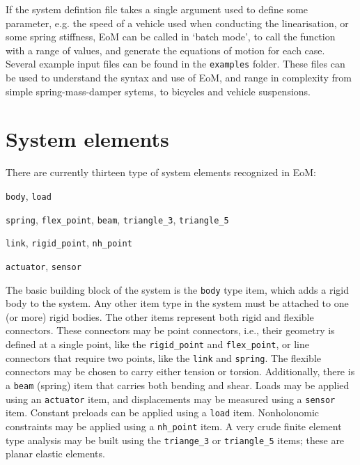 If the system defintion file takes a single argument used to define some parameter, e.g. the speed of a vehicle used when conducting the linearisation, or some spring stiffness, EoM can be called in `batch mode', to call the function with a range of values, and generate the equations of motion for each case.  Several example input files can be found in the \texttt{examples} folder.  These files can be used to understand the syntax and use of EoM, and range in complexity from simple spring-mass-damper sytems, to bicycles and vehicle suspensions.

\section{System elements}

There are currently thirteen type of system elements recognized in EoM:
\begin{description}\setlength\itemsep{0pt plus 0.3ex}
\item[fundamental:] \texttt{body}, \texttt{load}
\item[flexible connectors:] \texttt{spring}, \texttt{flex\_point}, \texttt{beam}, \texttt{triangle\_3}, \texttt{triangle\_5}
\item[rigid connectors:]\texttt{link}, \texttt{rigid\_point}, \texttt{nh\_point}
\item[input/output:] \texttt{actuator}, \texttt{sensor}
\end{description}

The basic building block of the system is the \texttt{body} type item, which adds a rigid body to the system.  Any other item type in the system must be attached to one (or more) rigid bodies.  The other items represent both rigid and flexible connectors.  These connectors may be point connectors, i.e., their geometry is defined at a single point, like the \texttt{rigid\_point} and \texttt{flex\_point}, or line connectors that require two points, like the \texttt{link} and \texttt{spring}.  The flexible connectors may be chosen to carry either tension or torsion.  Additionally, there is a \texttt{beam} (spring) item that carries both bending and shear.  Loads may be applied using an \texttt{actuator} item, and displacements may be measured using a \texttt{sensor} item.  Constant preloads can be applied using a \texttt{load} item.  Nonholonomic constraints may be applied using a \texttt{nh\_point} item.  A very crude finite element type analysis may be built using the \texttt{triange\_3} or \texttt{triangle\_5} items; these are planar elastic elements.
\clearpage


